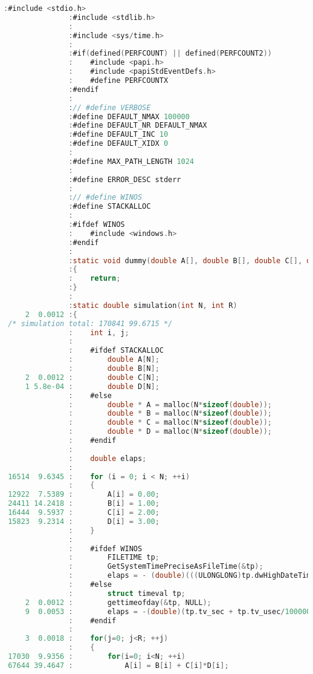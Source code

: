 \begin{lstlisting}[language=C,breaklines=true]
               :#include <stdio.h>
               :#include <stdlib.h>
               :
               :#include <sys/time.h>
               :
               :#if(defined(PERFCOUNT) || defined(PERFCOUNT2))
               :	#include <papi.h>
               :	#include <papiStdEventDefs.h>
               :	#define PERFCOUNTX
               :#endif
               :
               :// #define VERBOSE
               :#define DEFAULT_NMAX 100000
               :#define DEFAULT_NR DEFAULT_NMAX
               :#define DEFAULT_INC 10
               :#define DEFAULT_XIDX 0
               :
               :#define MAX_PATH_LENGTH 1024
               :
               :#define ERROR_DESC stderr
               :
               :// #define WINOS
               :#define STACKALLOC
               :
               :#ifdef WINOS 
               :	#include <windows.h>
               :#endif
               :
               :static void dummy(double A[], double B[], double C[], double D[])
               :{
               :	return;
               :}
               :
               :static double simulation(int N, int R)
     2  0.0012 :{
 /* simulation total: 170841 99.6715 */
               :	int i, j;
               :	
               :	#ifdef STACKALLOC
               :		double A[N];
               :		double B[N];
     2  0.0012 :		double C[N];
     1 5.8e-04 :		double D[N];
               :	#else
               :		double * A = malloc(N*sizeof(double));
               :		double * B = malloc(N*sizeof(double));
               :		double * C = malloc(N*sizeof(double));
               :		double * D = malloc(N*sizeof(double));
               :	#endif
               :	
               :	double elaps;
               :	
 16514  9.6345 :	for (i = 0; i < N; ++i)
               :	{
 12922  7.5389 :	    A[i] = 0.00;
 24411 14.2418 :	    B[i] = 1.00;
 16444  9.5937 :	    C[i] = 2.00;
 15823  9.2314 :	    D[i] = 3.00;
               :  	}
               :	
               :	#ifdef WINOS
               :		FILETIME tp;
               :		GetSystemTimePreciseAsFileTime(&tp);
               :		elaps = - (double)(((ULONGLONG)tp.dwHighDateTime << 32) | (ULONGLONG)tp.dwLowDateTime)/10000000.0;
               :	#else
               :		struct timeval tp;
     2  0.0012 :		gettimeofday(&tp, NULL);
     9  0.0053 :		elaps = -(double)(tp.tv_sec + tp.tv_usec/1000000.0);
               :	#endif
               :	
     3  0.0018 :	for(j=0; j<R; ++j)
               :	{
 17030  9.9356 :		for(i=0; i<N; ++i)
 67644 39.4647 :			A[i] = B[i] + C[i]*D[i];

\end{lstlisting}
